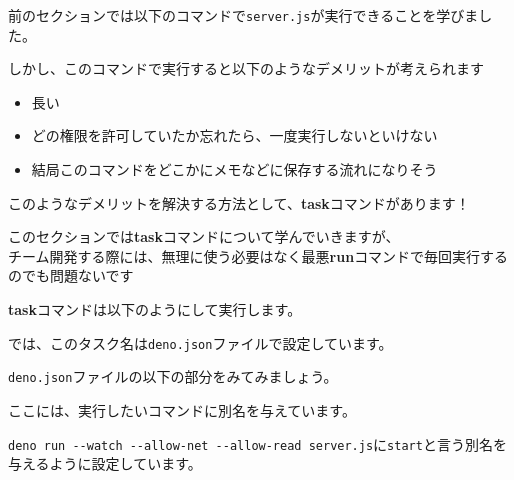 前のセクションでは以下のコマンドで\texttt{server.js}が実行できることを学びました。

\begin{Shaded}
\begin{Highlighting}[]
\end{Highlighting}
\end{Shaded}

しかし、このコマンドで実行すると以下のようなデメリットが考えられます

\begin{itemize}
\tightlist
\item
  長い
\item
  どの権限を許可していたか忘れたら、一度実行しないといけない
\item
  結局このコマンドをどこかにメモなどに保存する流れになりそう
\end{itemize}

このようなデメリットを解決する方法として、\textbf{task}コマンドがあります！

このセクションでは\textbf{task}コマンドについて学んでいきますが、\\
チーム開発する際には、無理に使う必要はなく最悪\textbf{run}コマンドで毎回実行するのでも問題ないです🙆‍♀️

\textbf{task}コマンドは以下のようにして実行します。

\begin{Shaded}
\begin{Highlighting}[]
\end{Highlighting}
\end{Shaded}

では、このタスク名は\texttt{deno.json}ファイルで設定しています。

\texttt{deno.json}ファイルの以下の部分をみてみましょう。

\begin{Shaded}
\begin{Highlighting}[]
   \FunctionTok{\{}
    \FunctionTok{:} 
  \FunctionTok{\}}\ErrorTok{,}
\end{Highlighting}
\end{Shaded}

ここには、実行したいコマンドに別名を与えています。

\texttt{deno\ run\ -\/-watch\ -\/-allow-net\ -\/-allow-read\ server.js}に\texttt{start}と言う別名を与えるように設定しています。

